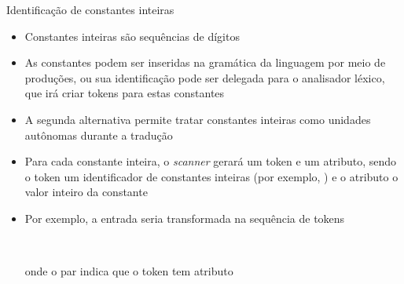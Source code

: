 \begin{frame}[fragile]{Identificação de constantes inteiras}

    \begin{itemize}
        \item Constantes inteiras são sequências de dígitos
        \pause

        \item As constantes podem ser inseridas na gramática da linguagem por meio de produções, ou sua identificação pode ser delegada para o analisador léxico,
            que irá criar tokens para estas constantes
        \pause

        \item A segunda alternativa permite tratar constantes inteiras como unidades autônomas durante a tradução
        \pause

        \item Para cada constante inteira, o \textit{scanner} gerará um token e um atributo, sendo o token um identificador de constantes inteiras (por exemplo,
            ) e o atributo o valor inteiro da constante
        \pause

        \item Por exemplo, a entrada  seria transformada na sequência de tokens
        \begin{center}
            \ \ \ \ \ \ \ \ \ \ \ \ \ \ \ \  
        \end{center}
        onde o par  indica que o token  tem atributo 
    \end{itemize}

\end{frame}

